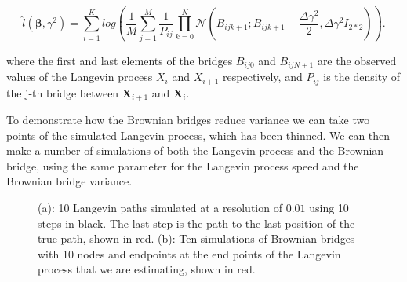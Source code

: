 $$
\hat{l}(\bm \beta, \gamma^2) = \sum_{i = 1}^K log( \frac{1}{M}\sum_{j=1}^M \frac{1}{P_{ij}}\prod_{k=0}^N \mathcal{N}(B_{ijk+1} ; B_{ijk+1} - \frac{\Delta \gamma^2}{2}, \Delta\gamma^2 I_{2*2})).
$$

where the first and last elements of the bridges $B_{ij0}$ and $B_{ijN+1}$ are the observed values of the Langevin process $X_i$ and $X_{i+1}$ respectively, and $P_{ij}$ is the density of the j-th bridge between $\textbf{X}_{i+1}$ and $\textbf{X}_i$.

To demonstrate how the Brownian bridges reduce variance we can take two points of the simulated Langevin process, which has been thinned. We can then make a number of simulations of both the Langevin process and the Brownian bridge, using the same parameter for the Langevin process speed and the Brownian bridge variance.


\begin{figure}[H]%
    \centering
    \qquad
    \caption[Langevin and Brownian bridge paths]{(a): 10 Langevin paths simulated at a resolution of $0.01$ using 10 steps in black. The last step is the path to the last position of the true path, shown in red. (b): Ten simulations of Brownian bridges with 10 nodes and endpoints at the end points of the Langevin process that we are estimating, shown in red.}%
    \label{fig:monte carlo paths}%
\end{figure}


